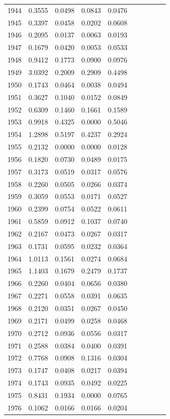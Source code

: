\begin{table}
\begin{tabular}{cccccccccc}
1944& 0.3555& 0.0498& 0.0843& 0.0476\\ 
1945& 0.3397& 0.0458& 0.0202& 0.0608\\ 
1946& 0.2095& 0.0137& 0.0063& 0.0193\\ 
1947& 0.1679& 0.0420& 0.0053& 0.0533\\ 
1948& 0.9412& 0.1773& 0.0900& 0.0976\\ 
1949& 3.0392& 0.2009& 0.2909& 0.4498\\ 
1950& 0.1743& 0.0464& 0.0038& 0.0494\\ 
1951& 0.3627& 0.1040& 0.0152& 0.0849\\ 
1952& 0.6309& 0.1460& 0.1661& 0.1589\\ 
1953& 0.9918& 0.4325& 0.0000& 0.5046\\ 
1954& 1.2898& 0.5197& 0.4237& 0.2924\\ 
1955& 0.2132& 0.0000& 0.0000& 0.0128\\ 
1956& 0.1820& 0.0730& 0.0489& 0.0175\\ 
1957& 0.3173& 0.0519& 0.0317& 0.0576\\ 
1958& 0.2260& 0.0505& 0.0266& 0.0374\\ 
1959& 0.3059& 0.0553& 0.0171& 0.0527\\ 
1960& 0.2399& 0.0754& 0.0522& 0.0611\\ 
1961& 0.5859& 0.0912& 0.1037& 0.0740\\ 
1962& 0.2167& 0.0473& 0.0267& 0.0317\\ 
1963& 0.1731& 0.0595& 0.0232& 0.0364\\ 
1964& 1.0113& 0.1561& 0.0274& 0.0684\\ 
1965& 1.1403& 0.1679& 0.2479& 0.1737\\ 
1966& 0.2260& 0.0404& 0.0656& 0.0380\\ 
1967& 0.2271& 0.0558& 0.0391& 0.0635\\ 
1968& 0.2120& 0.0351& 0.0267& 0.0450\\ 
1969& 0.2171& 0.0499& 0.0258& 0.0468\\ 
1970& 0.2712& 0.0936& 0.0556& 0.0317\\ 
1971& 0.2588& 0.0384& 0.0400& 0.0391\\ 
1972& 0.7768& 0.0908& 0.1316& 0.0304\\ 
1973& 0.1747& 0.0408& 0.0217& 0.0394\\ 
1974& 0.1743& 0.0935& 0.0492& 0.0225\\ 
1975& 0.8431& 0.1934& 0.0000& 0.0765\\ 
1976& 0.1062& 0.0166& 0.0166& 0.0204\\ 

\end{tabular}
\end{table}
